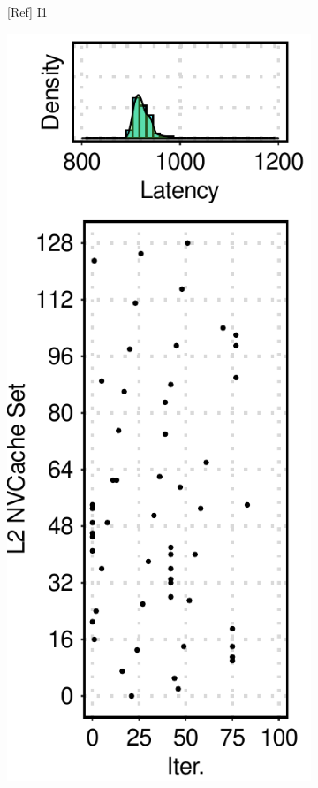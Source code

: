 \begin{figure}[t]
\begin{subfigure}[b]{.12\textwidth}
        \caption{[Ref] I1}
        \label{fig:12:ref:side-channel-feature-i1}
    \end{subfigure}
    \hfill
    \begin{subfigure}[b]{.12\linewidth}
        \centering
        \includegraphics[width=\linewidth]{figure/plot/reference/fig12-side-sql-s1.pdf}

\end{subfigure}
\end{figure}
